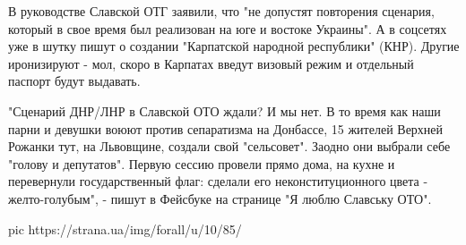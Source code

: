 В руководстве Славской ОТГ заявили, что "не допустят повторения сценария,
который в свое время был реализован на юге и востоке Украины". А в
соцсетях уже в шутку пишут о создании "Карпатской народной республики"
(КНР). Другие иронизируют - мол, скоро в Карпатах введут визовый режим и
отдельный паспорт будут выдавать.

"Сценарий ДНР/ЛНР в Славской ОТО ждали? И мы нет. В то время как наши
парни и девушки воюют против сепаратизма на Донбассе, 15 жителей Верхней
Рожанки тут, на Львовщине, создали свой "сельсовет". Заодно они выбрали
себе "голову и депутатов". Первую сессию провели прямо дома, на кухне и
перевернули государственный флаг: сделали  его неконституционного цвета -
желто-голубым", - пишут в Фейсбуке на странице "Я люблю Славську ОТО". 

\ifcmt
pic https://strana.ua/img/forall/u/10/85/%
\fi


